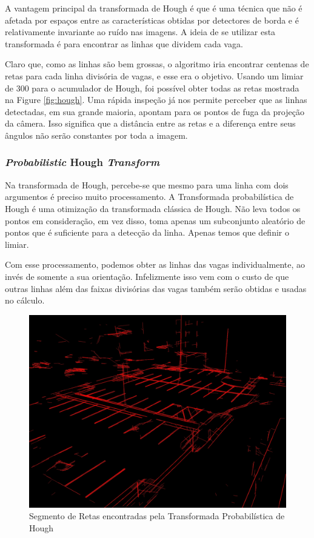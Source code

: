 \documentclass[10pt,twocolumn,letterpaper]{article}
\begin{document}
	A vantagem principal da transformada de Hough é que é uma técnica que não é afetada
por espaços entre as características obtidas por detectores de borda e é relativamente invariante
ao ruído nas imagens. A ideia de se utilizar esta transformada é para encontrar as linhas que dividem
cada vaga.

	Claro que, como as linhas são bem grossas, o algoritmo iria encontrar centenas
de retas para cada linha divisória de vagas, e esse era o objetivo. Usando um limiar de
300 para o acumulador de Hough, foi possível obter todas as retas mostrada na Figure
\ref{fig:hough}. Uma rápida inspeção já nos permite perceber que as linhas detectadas,
em sua grande maioria, apontam para os pontos de fuga da projeção da câmera.
Isso significa que a distância entre as retas e a diferença entre seus ângulos não serão constantes
por toda a imagem.

\subsubsection{{\em Probabilistic} Hough {\em Transform}}

	Na transformada de Hough, percebe-se que mesmo para uma linha com dois argumentos
é preciso muito processamento. A Transformada probabilística de Hough{\footnotesize \cite{probabilistic-hough}}
é uma otimização da transformada clássica de Hough. Não leva todos os pontos em consideração,
em vez disso, toma apenas um subconjunto aleatório de pontos que é suficiente para a detecção
da linha. Apenas temos que definir o limiar.

	Com esse processamento, podemos obter as linhas das vagas individualmente, ao invés de
somente a sua orientação. Infelizmente isso vem com o custo de que outras linhas além das faixas
divisórias das vagas também serão obtidas e usadas no cálculo.


\begin{figure}[!htb]
\centering
\includegraphics[width=\columnwidth]{hough-segmentolinhas.jpg}
\caption{Segmento de Retas encontradas pela Transformada Probabilística de Hough}
\label{Rotulo}
\end{figure}
\end{document}
